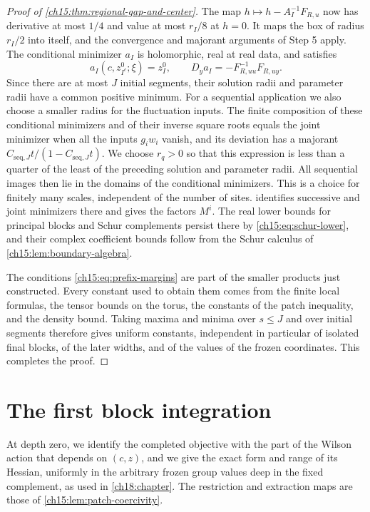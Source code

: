 \begin{proof}[Proof of \cref{ch15:thm:regional-gap-and-center}]
The map $h\mapsto h-A_I^{-1}F_{R,u}$ now has derivative at most $1/4$ and value at most $r_I/8$ at $h=0$. It maps the box of radius $r_I/2$ into itself, and the convergence and majorant arguments of Step 5 apply. The conditional minimizer $a_I$ is holomorphic, real at real data, and satisfies
\[
 a_I(c,z_{I^c}^0;\xi)=z_I^0,\qquad
 D_y a_I=-F_{R,uu}^{-1}F_{R,uy}.
\]
Since there are at most $J$ initial segments, their solution radii and parameter radii have a common positive minimum. For a sequential application we also choose a smaller radius for the fluctuation inputs. The finite composition of these conditional minimizers and of their inverse square roots equals the joint minimizer when all the inputs $g_iw_i$ vanish, and its deviation has a majorant $C_{\mathrm{seq},J}t/(1-C_{\mathrm{seq},J}t)$. We choose $r_q>0$ so that this expression is less than a quarter of the least of the preceding solution and parameter radii. All sequential images then lie in the domains of the conditional minimizers. This is a choice for finitely many scales, independent of the number of sites.  identifies successive and joint minimizers there and gives the factors $M^i$. The real lower bounds for principal blocks and Schur complements persist there by \eqref{ch15:eq:schur-lower}, and their complex coefficient bounds follow from the Schur calculus of \cref{ch15:lem:boundary-algebra}.

The conditions \eqref{ch15:eq:prefix-margins} are part of the smaller products just constructed. Every constant used to obtain them comes from the finite local formulas, the tensor bounds on the torus, the constants of the patch inequality, and the density bound. Taking maxima and minima over $s\le J$ and over initial segments therefore gives uniform constants, independent in particular of isolated final blocks, of the later widths, and of the values of the frozen coordinates. This completes the proof.
\end{proof}

\section{The first block integration}\label{ch15:sec:bare}

At depth zero, we identify the completed objective with the part of the Wilson action that depends on $(c,z)$, and we give the exact form and range of its Hessian, uniformly in the arbitrary frozen group values deep in the fixed complement, as used in \cref{ch18:chapter}. The restriction and extraction maps are those of \cref{ch15:lem:patch-coercivity}.

